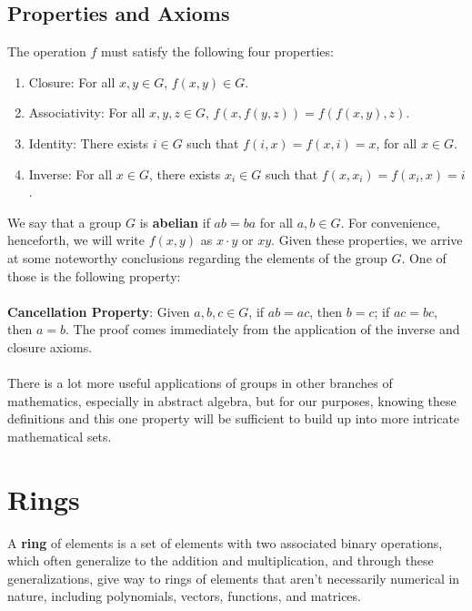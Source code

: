 \documentclass[11pt]{report}
\begin{document}
\subsection{Properties and Axioms}
The operation $f$ must satisfy the following four properties:
\begin{enumerate}
\item Closure: For all $x,y \in G$, $f(x,y) \in G$.
\item Associativity: For all $x,y,z \in G$, $f(x,f(y,z)) = f(f(x,y),z)$.
\item Identity: There exists $i \in G$ such that $f(i,x) = f(x,i) = x$, for all $x \in G$.
\item Inverse: For all $x \in G$, there exists $x_i \in G$ such that $f(x, x_i) = f(x_i, x) = i$. 
\end{enumerate}
We say that a group $G$ is \textbf{abelian} if $ab = ba$ for all $a,b \in G$. For convenience, henceforth, we will write $f(x,y)$ as $x \cdot y$ or $xy$. Given these properties, we arrive at some noteworthy conclusions regarding the elements of the group $G$. One of those is the following property:
\\ \\
\textbf{Cancellation Property}: Given $a,b,c \in G$, if $ab = ac$, then $b = c$; if $ac = bc$, then $a = b$. The proof comes immediately from the application of the inverse and closure axioms.
\\ \\
There is a lot more useful applications of groups in other branches of mathematics, especially in abstract algebra, but for our purposes, knowing these definitions and this one property will be sufficient to build up into more intricate mathematical sets.
\section{Rings}
A \textbf{ring} of elements is a set of elements with two associated binary operations, which often generalize to the addition and multiplication, and through these generalizations, give way to rings of elements that aren't necessarily numerical in nature, including polynomials, vectors, functions, and matrices.
\end{document}
